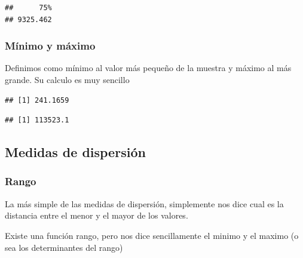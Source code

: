 \documentclass[
]{book}
\newenvironment{Shaded}{\begin{snugshade}}{\end{snugshade}}
\newcommand{\FunctionTok}[1]{\textcolor[rgb]{0.00,0.00,0.00}{#1}}
\newcommand{\NormalTok}[1]{#1}
\newcommand{\SpecialCharTok}[1]{\textcolor[rgb]{0.00,0.00,0.00}{#1}}
\begin{document}
\begin{verbatim}
##      75% 
## 9325.462
\end{verbatim}

\hypertarget{muxednimo-y-muxe1ximo}{%
\subsubsection{Mínimo y máximo}\label{muxednimo-y-muxe1ximo}}

Definimos como mínimo al valor más pequeño de la muestra y máximo al más grande.
Su calculo es muy sencillo

\begin{Shaded}
\end{Shaded}

\begin{verbatim}
## [1] 241.1659
\end{verbatim}

\begin{Shaded}
\end{Shaded}

\begin{verbatim}
## [1] 113523.1
\end{verbatim}

\hypertarget{medidas-de-dispersiuxf3n}{%
\subsection{Medidas de dispersión}\label{medidas-de-dispersiuxf3n}}

\hypertarget{rango}{%
\subsubsection{Rango}\label{rango}}

La más simple de las medidas de dispersión, simplemente nos dice cual es la distancia entre el menor y el mayor de los valores.

Existe una función rango, pero nos dice sencillamente el minimo y el maximo (o sea los determinantes del rango)

\begin{Shaded}
\end{Shaded}
\end{document}
